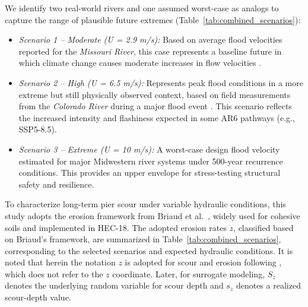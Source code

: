 \documentclass[authoryear,preprint,review,12pt]{elsarticle}
\begin{document}
We identify two real-world rivers and one assumed worst-case as analogs to capture the range of plausible future extremes (Table~\ref{tab:combined_scenarios}):
\begin{itemize}
    \item \textit{Scenario 1 – Moderate (U = 2.9 m/s):} Based on average flood velocities reported for the \textit{Missouri River}, this case represents a baseline future in which climate change causes moderate increases in flow velocities \citep{modot2020tr202017}.
    
    \item \textit{Scenario 2 – High (U = 6.5 m/s):} Represents peak flood conditions in a more extreme but still physically observed context, based on field measurements from the \textit{Colorado River} during a major flood event \citep{Dawson2009}. This scenario reflects the increased intensity and flashiness expected in some AR6 pathways (e.g., SSP5-8.5).
    
    \item \textit{Scenario 3 – Extreme (U = 10 m/s):} A worst-case design flood velocity estimated for major Midwestern river systems under 500-year recurrence conditions. This provides an upper envelope for stress-testing structural safety and resilience.
\end{itemize}

To characterize long-term pier scour under variable hydraulic conditions, this study adopts the erosion framework from Briaud et al.\ \citep{Briaud1999}, widely used for cohesive soils and implemented in HEC-18. The adopted erosion rates $\dot{z}$, classified based on Briaud’s framework, are summarized in Table~\ref{tab:combined_scenarios}, corresponding to the selected scenarios and expected hydraulic conditions. It is noted that herein the notation $z$ is adopted for scour and erosion following \citet{Briaud1999}, which does not refer to the $z$ coordinate. Later, for surrogate modeling, $S_z$ denotes the underlying random variable for scour depth and $s_z$ denotes a realized scour-depth value.

\begin{table}[htbp]
\caption{Scenario-Based Hydraulic Inputs and Scour Predictions (LHS, $N=1000$)}
\label{tab:combined_scenarios}
\centering
\small
{}
\end{table}
\end{document}
